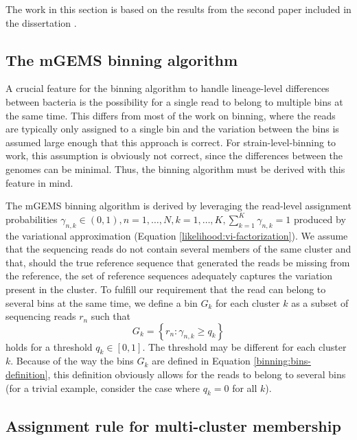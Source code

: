 \documentclass[officiallayout]{tktla}
\begin{document}
The work in this section is based on the results from the second paper
included in the dissertation \citep{maklin_bacterial_2021}.

\subsection{The mGEMS binning algorithm}

A crucial feature for the binning algorithm to handle lineage-level
differences between bacteria is the possibility for a single read to
belong to multiple bins at the same time. This differs from most of
the work on binning, where the reads are typically only assigned to a
single bin and the variation between the bins is assumed large enough
that this approach is correct. For strain-level-binning to work, this
assumption is obviously not correct, since the differences between the
genomes can be minimal. Thus, the binning algorithm must be derived
with this feature in mind.

The mGEMS binning algorithm is derived by leveraging the read-level
assignment probabilities $\gamma_{n, k} \in \left(0, 1\right), n = 1,
\dots, N, k = 1, \dots, K, \sum_{k = 1}^{K}\gamma_{n, k} = 1$ produced
by the variational approximation (Equation
\ref{likelihood:vi-factorization}). We assume that the sequencing
reads do not contain several members of the same cluster and that,
should the true reference sequence that generated the reads be missing
from the reference, the set of reference sequences adequately captures
the variation present in the cluster. To fulfill our requirement that
the read can belong to several bins at the same time, we define a bin
$G_{k}$ for each cluster $k$ as a subset of sequencing reads $r_{n}$
such that
\begin{equation}
  \label{binning:bins-definition}
  G_{k} = \left\{r_{n} : \gamma_{n, k} \geq q_{k}\right\}
\end{equation}
holds for a threshold $q_{k} \in \left[0, 1\right]$. The threshold may
be different for each cluster $k$. Because of the way the bins $G_{k}$
are defined in Equation \ref{binning:bins-definition}, this definition
obviously allows for the reads to belong to several bins (for a
trivial example, consider the case where $q_{k} = 0$ for all $k$).

\subsection{Assignment rule for multi-cluster membership}
\end{document}
